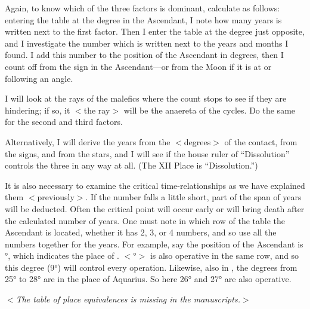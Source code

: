 Again, to know which of the three factors is dominant, calculate as follows: entering the table at the degree in the Ascendant, I note how many years is written next to the first factor. Then I enter the table at
the degree just opposite, and I investigate the number which is written next to the years and months I found. I add this number to the position of the Ascendant in degrees, then I count off from the sign in the
Ascendant—or from the Moon if it is at or following an angle. 

I will look at the rays of the malefics where the count stops to see if they are hindering; if so, it $<$the ray$>$ will be the anaereta of the cycles. Do the same for the second and third factors.

Alternatively, I will derive the years from the $<$degrees$>$ of the contact, from the signs, and from the stars, and I will see if the house ruler of “Dissolution” controls the three in any way at all. (The XII Place
is “Dissolution.”) 

It is also necessary to examine the critical time-relationships as we have explained them $<$previously$>$. If the number falls a little short, part of the span of years will be deducted. Often the critical
point will occur early or will bring death after the calculated number of years. One must note in which row of the table the Ascendant is located, whether it has 2, 3, or 4 numbers, and so use all the numbers together for the years. For example, say the position of the Ascendant is \Cancer\xspace 8°, which indicates the place of \Taurus. $<$\Cancer\xspace 9°$>$ is also operative in the same row, and so this degree (9°) will control every operation. Likewise, also in \Cancer, the degrees from 25° to 28° are in the place of Aquarius. So here 26°
and 27° are also operative.

\textit{$<$The table of place equivalences is missing in the manuscripts.$>$}
\newpage